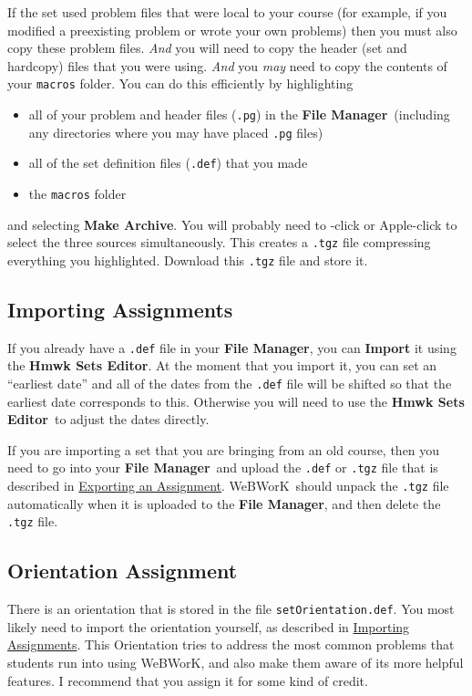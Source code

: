 \documentclass[12pt]{article}
\newcommand{\menu}[1]{\textbf{#1}}
\newcommand{\WW}{WeBWorK}
\newcommand{\HSE}{\menu{Hmwk Sets Editor}}
\newcommand{\FM}{\menu{File Manager}}
\begin{document}
If the set used problem files that were local to your course (for example, if you modified a preexisting problem or wrote your own problems) then you must also copy these problem files.  \emph{And} you will need to copy the header (set and hardcopy) files that you were using.  \emph{And} you \emph{may} need to copy the contents of your \texttt{macros} folder. You can do this efficiently by highlighting 
\begin{itemize}
\item all of your problem and header files (\texttt{.pg}) in the \FM\  (including any directories where you may have placed \texttt{.pg} files) 
\item all of the set definition files (\texttt{.def}) that you made
\item the \texttt{macros} folder 
\end{itemize}
and selecting \menu{Make Archive}.  You will probably need to \Ctrl-click or Apple-click to select the three sources simultaneously.  This creates a \texttt{.tgz} file compressing everything you highlighted.  Download this \texttt{.tgz} file and store it.

\subsection{Importing Assignments}\label{imp}
If you already have  a \texttt{.def} file in your \FM, you can \menu{Import} it using the \HSE.  At the moment that you import it, you can set an ``earliest date'' and all of the dates from the \texttt{.def} file will be shifted so that the earliest date corresponds to this. Otherwise you will need to use the \HSE\ to adjust the dates directly.

If you are importing a set that you are bringing from an old course, then you need to go into your \FM\ and upload the \texttt{.def} or \texttt{.tgz} file that is described in \hyperref[exp]{Exporting an Assignment}.  \WW\ should unpack the \texttt{.tgz} file automatically when it is uploaded to the \FM, and then delete the \texttt{.tgz} file.

\subsection{Orientation Assignment}\label{orientation}
There is an orientation that is stored in the file \texttt{setOrientation.def}. You most likely need to import the orientation yourself, as described in \hyperref[imp]{Importing Assignments}.  This Orientation tries to address the most common problems that students run into using \WW, and also make them aware of its more helpful features.  I recommend that you assign it for some kind of credit.
\end{document}
